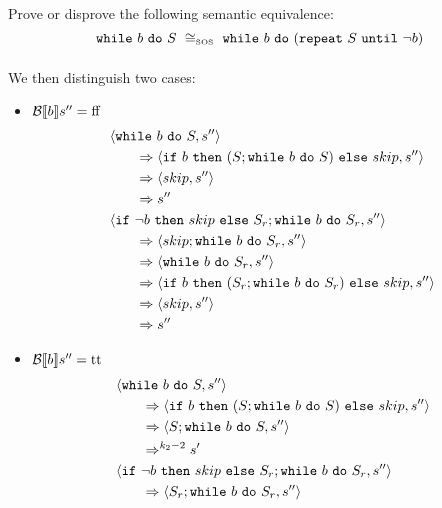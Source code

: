 \begin{exercise}{
    Prove or disprove the following semantic equivalence:
    \[ \wwhile{b}{S}\ \SOScong\ \wwhile{b}{(\wrepeat{S}{\neg b})}  \]
}
\begin{itemize}
\begin{itemize}
\begin{itemize}
\begin{align*}
                            \end{align*}
                            We then distinguish two cases:
                            \begin{itemize}
                                \item $\mathcal{B} \llbracket b \rrbracket s'' = \text{ff}$
                                    \begin{align*}
                                        &\left<\texttt{while}\ b\ \texttt{do}\ S, s''\right>
                                        \\&\qquad\Rightarrow \left<\texttt{if}\ b\ \texttt{then}\ (S; \texttt{while}\ b\ \texttt{do}\ S)\ \texttt{else}\ skip, s''\right>
                                        \\&\qquad\Rightarrow \left<skip, s''\right>
                                        \\&\qquad\Rightarrow s''
                                        \\
                                        &\left<\texttt{if}\ \neg b\ \texttt{then}\ skip\ \texttt{else}\ S_r; \texttt{while}\ b\ \texttt{do}\ S_r, s''\right>
                                        \\&\qquad\Rightarrow \left<skip; \texttt{while}\ b\ \texttt{do}\ S_r, s''\right>
                                        \\&\qquad\Rightarrow \left<\texttt{while}\ b\ \texttt{do}\ S_r, s''\right>
                                        \\&\qquad\Rightarrow \left<\texttt{if}\ b\ \texttt{then}\ (S_r; \texttt{while}\ b\ \texttt{do}\ S_r)\ \texttt{else}\ skip, s''\right>
                                        \\&\qquad\Rightarrow \left<skip, s''\right>
                                        \\&\qquad\Rightarrow s''
                                    \end{align*}
                                \item $\mathcal{B} \llbracket b \rrbracket s'' = \text{tt}$
                                    \begin{align*}
                                        &\instr{\wwhile{b}{S}}{s''}
                                        \\&\qquad\Rightarrow \instr{\wif{b}{(S; \wwhile{b}{S})}{skip}}{s''}
                                        \\&\qquad\Rightarrow \instr{S; \wwhile{b}{S}}{s''}
                                        \\&\qquad\Rightarrow^{k_2 - 2} s'
                                        \\
                                        &\instr{\wif{\neg b}{skip}{S_r}; \wwhile{b}{S_r}}{s''}
                                        \\&\qquad\Rightarrow \instr{S_r; \wwhile{b}{S_r}}{s''}

\end{align*}
\end{itemize}
\end{itemize}
\end{itemize}
\end{itemize}
\end{exercise}
